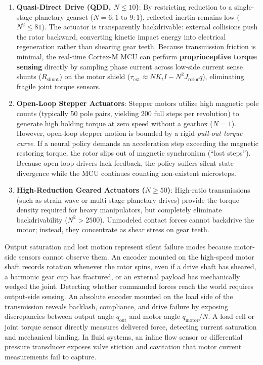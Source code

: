 \documentclass[
  letterpaper,
  DIV=11,
  numbers=noendperiod]{scrartcl}
\providecommand{\tightlist}{%
  \setlength{\itemsep}{0pt}\setlength{\parskip}{0pt}}
\begin{document}
\begin{enumerate}
\def\labelenumi{\arabic{enumi}.}
\tightlist
\item
  \textbf{Quasi-Direct Drive (QDD, \(N \le 10\))}: By restricting
  reduction to a single-stage planetary gearset
  (\(N = 6:1\text{ to }9:1\)), reflected inertia remains low
  (\(N^2 \le 81\)). The actuator is transparently backdrivable: external
  collisions push the rotor backward, converting kinetic impact energy
  into electrical regeneration rather than shearing gear teeth. Because
  transmission friction is minimal, the real-time Cortex-M MCU can
  perform \textbf{proprioceptive torque sensing} directly by sampling
  phase current across low-side current sense shunts
  (\(R_{\text{shunt}}\)) on the motor shield
  (\(\tau_{\text{ext}} \approx N K_t I - N^2 J_{\text{rotor}} \ddot{q}\)),
  eliminating fragile joint torque sensors.
\item
  \textbf{Open-Loop Stepper Actuators}: Stepper motors utilize high
  magnetic pole counts (typically 50 pole pairs, yielding 200 full steps
  per revolution) to generate high holding torque at zero speed without
  a gearbox (\(N = 1\)). However, open-loop stepper motion is bounded by
  a rigid \emph{pull-out torque curve}. If a neural policy demands an
  acceleration step exceeding the magnetic restoring torque, the rotor
  slips out of magnetic synchronism (``lost steps''). Because open-loop
  drivers lack feedback, the policy suffers silent state divergence
  while the MCU continues counting non-existent microsteps.
\item
  \textbf{High-Reduction Geared Actuators (\(N \ge 50\))}: High-ratio
  transmissions (such as strain wave or multi-stage planetary drives)
  provide the torque density required for heavy manipulators, but
  completely eliminate backdrivability (\(N^2 > 2500\)). Unmodeled
  contact forces cannot backdrive the motor; instead, they concentrate
  as shear stress on gear teeth.
\end{enumerate}

Output saturation and lost motion represent silent failure modes because
motor-side sensors cannot observe them. An encoder mounted on the
high-speed motor shaft records rotation whenever the rotor spins, even
if a drive shaft has sheared, a harmonic gear cup has fractured, or an
external payload has mechanically wedged the joint. Detecting whether
commanded forces reach the world requires output-side sensing. An
absolute encoder mounted on the load side of the transmission reveals
backlash, compliance, and drive failure by exposing discrepancies
between output angle \(q_{\text{out}}\) and motor angle
\(q_{\text{motor}} / N\). A load cell or joint torque sensor directly
measures delivered force, detecting current saturation and mechanical
binding. In fluid systems, an inline flow sensor or differential
pressure transducer exposes valve stiction and cavitation that motor
current measurements fail to capture.
\end{document}
